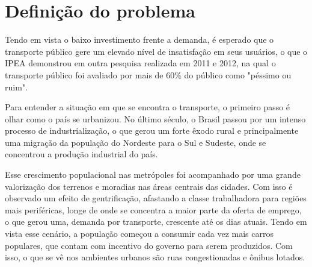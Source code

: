 \section{Definição do problema}
\indent
\par Tendo em vista o baixo investimento frente a demanda, é esperado que o transporte público gere um elevado nível de insatisfação em seus usuários, o que o IPEA demonstrou em outra pesquisa realizada em 2011 e 2012, na qual o transporte público foi avaliado por mais de 60\% do público como "péssimo ou ruim".
\par Para entender a situação em que se encontra o transporte, o primeiro passo é olhar como o país se urbanizou. No último século, o Brasil passou por um intenso processo de industrialização, o que gerou um forte êxodo rural e principalmente uma migração da população do Nordeste para o Sul e Sudeste, onde se concentrou a produção industrial do país.
\par Esse crescimento populacional nas metrópoles foi acompanhado por uma grande valorização dos terrenos e moradias nas áreas centrais das cidades. Com isso é observado um efeito de gentrificação, afastando a classe trabalhadora para regiões mais periféricas, longe de onde se concentra a maior parte da oferta de emprego, o que gerou uma, demanda por transporte, crescente até os dias atuais.
Tendo em vista esse cenário, a população começou a consumir cada vez mais carros populares, que contam com incentivo do governo para serem produzidos. Com isso, o que se vê nos ambientes urbanos são ruas congestionadas e ônibus lotados.

